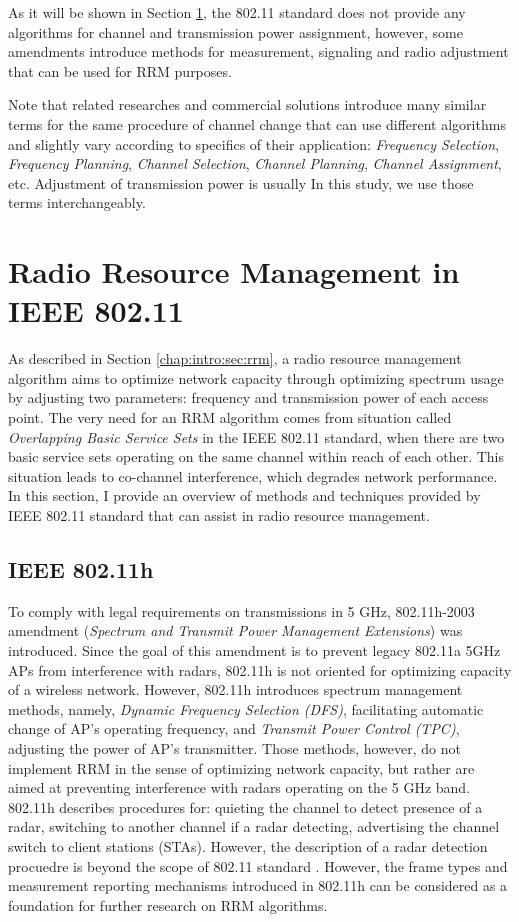 As it will be shown in Section \ref{chap:lr:sec:rrm_80211}, the 802.11 standard does not provide any algorithms for channel and transmission power assignment, however, some amendments introduce methods for measurement, signaling and radio adjustment that can be used for RRM purposes.

Note that related researches and commercial solutions introduce many similar terms for the same procedure of channel change that can use different algorithms and slightly vary according to specifics of their application: \textit{Frequency Selection}, \textit{Frequency Planning}, \textit{Channel Selection}, \textit{Channel Planning}, \textit{Channel Assignment}, etc. Adjustment of transmission power is usually
In this study, we use those terms interchangeably.

\section {Radio Resource Management in IEEE 802.11}
\label{chap:lr:sec:rrm_80211}
As described in Section \ref{chap:intro:sec:rrm}, a radio resource management algorithm aims to optimize network capacity through optimizing spectrum usage by adjusting two parameters: frequency and transmission power of each access point. The very need for an RRM algorithm comes from situation called \textit{Overlapping Basic Service Sets} in the IEEE 802.11 standard, when there are two basic service sets operating on the same channel within reach of each other. This situation leads to co-channel interference, which degrades network performance. In this section, I provide an overview of methods and techniques provided by IEEE 802.11 standard that can assist in radio resource management.


\subsection {IEEE 802.11h}
\label{chap:lr:sec:80211h}
To comply with legal requirements on transmissions in 5 GHz, 802.11h-2003 \cite{ieee80211h} amendment (\textit{Spectrum and Transmit Power Management Extensions}) was introduced. Since the goal of this amendment is to prevent legacy 802.11a 5GHz APs from interference with radars, 802.11h is not oriented for optimizing capacity of a wireless network. However, 802.11h introduces \cite{konsgenSpectrumManagementAlgorithms2010} spectrum management methods, namely, \textit{Dynamic Frequency Selection (DFS)}, facilitating automatic change of AP's operating frequency, and \textit{Transmit Power Control (TPC)}, adjusting the power of AP's transmitter.
Those methods, however, do not implement RRM in the sense of optimizing network capacity, but rather are aimed at preventing interference with radars operating on the 5 GHz band. 802.11h describes procedures for: quieting the channel to detect presence of a radar, switching to another channel if a radar detecting, advertising the channel switch to client stations (STAs). However, the description of a radar detection procuedre is beyond the scope of 802.11 standard \cite{ieee80211h}.
However, the frame types and measurement reporting mechanisms introduced in 802.11h can be considered as a foundation for further research on RRM algorithms.


